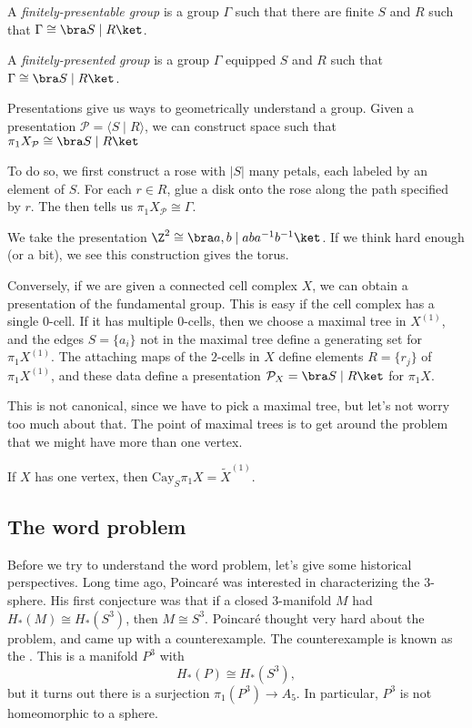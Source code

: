 \documentclass[a4paper]{article}
\newcommand\Cay{\mathrm{Cay}}
\begin{document}
\begin{defi}
  A \emph{finitely-presentable group} is a group $\Gamma$ such that there are finite $S$ and $R$ such that $\Gamma \cong \bra S \mid R\ket$.

  A \emph{finitely-presented group} is a group $\Gamma$ equipped $S$ and $R$ such that $\Gamma \cong \bra S \mid R \ket$.
\end{defi}

Presentations give us ways to geometrically understand a group. Given a presentation $\mathcal{P} = \langle S \mid R \rangle$, we can construct space  such that $\pi_1 X_\mathcal{P} \cong \bra S \mid R\ket$

To do so, we first construct a rose with $|S|$ many petals, each labeled by an element of $S$. For each $r \in R$, glue a disk onto the rose along the path specified by $r$. The  then tells us $\pi_1 X_{\mathcal{P}} \cong \Gamma$.

\begin{eg}
  We take the presentation $\Z^2 \cong \bra a, b \mid aba^{-1}b^{-1}\ket$. If we think hard enough (or a bit), we see this construction gives the torus.
\end{eg}

Conversely, if we are given a connected cell complex $X$, we can obtain a presentation of the fundamental group. This is easy if the cell complex has a single $0$-cell. If it has multiple $0$-cells, then we choose a maximal tree in $X^{(1)}$, and the edges $S = \{a_i\}$ not in the maximal tree define a generating set for $\pi_1 X^{(1)}$. The attaching maps of the $2$-cells in $X$ define elements $R = \{r_j\}$ of $\pi_1 X^{(1)}$, and these data define a presentation $\mathcal{P}_X = \bra S \mid R\ket$ for $\pi_1 X$.

This is not canonical, since we have to pick a maximal tree, but let's not worry too much about that. The point of maximal trees is to get around the problem that we might have more than one vertex.

\begin{ex}
  If $X$ has one vertex, then $\Cay_S \pi_1 X = \tilde{X}^{(1)}$.
\end{ex}

\subsection{The word problem}
Before we try to understand the word problem, let's give some historical perspectives. Long time ago, Poincar\'e was interested in characterizing the $3$-sphere. His first conjecture was that if a closed $3$-manifold $M$ had $H_*(M) \cong H_*(S^3)$, then $M \cong S^3$. Poincar\'e thought very hard about the problem, and came up with a counterexample. The counterexample is known as the . This is a manifold $P^3$ with
\[
  H_*(P) \cong H_*(S^3),
\]
but it turns out there is a surjection $\pi_1(P^3) \to A_5$. In particular, $P^3$ is not homeomorphic to a sphere.
\end{document}

